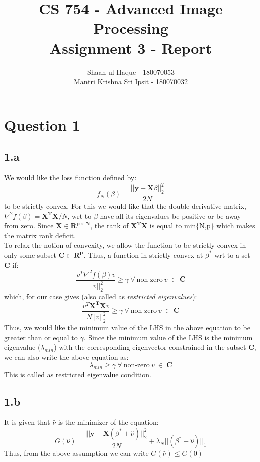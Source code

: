 \documentclass[12pt]{article}
\title{CS 754 - Advanced Image Processing\\Assignment 3 - Report}
\author{Shaan ul Haque - 180070053\\Mantri Krishna Sri Ipsit - 180070032}
\begin{document}
\maketitle

\section*{Question 1}
\subsection*{1.a}
We would like the loss function defined by:
\begin{equation*}
    f_N(\beta) = \frac{|| \boldsymbol{y-X}\beta||^2_2}{2N}
\end{equation*}
to be strictly convex. For this we would like that the double derivative matrix, $\nabla^2 f(\beta) = \boldsymbol{X^TX}/N$, wrt to $\beta$ have all its eigenvalues be positive or be away from zero. Since $\boldsymbol{X} \in \boldsymbol{R^{p \times N}}$, the rank of $\boldsymbol{X^TX}$ is equal to min\{N,p\} which makes the matrix rank deficit.\\
To relax the notion of convexity, we allow the function to be strictly convex in only some subset $\boldsymbol{C} \subset \boldsymbol{R^p}$. Thus, a function in strictly convex at $\beta^*$ wrt to a set $\boldsymbol{C}$ if:
\begin{equation*}
    \frac{v^T\nabla^2 f(\beta)v}{||v||^2_2} \geq \gamma \ \forall \ \textrm{non-zero} \ v \ \in \ \boldsymbol{C}
\end{equation*}
which, for our case gives (also called as \textit{restricted eigenvalues}):
\begin{equation*}
    \frac{v^T\boldsymbol{X^TX}v}{N||v||^2_2} \geq \gamma \ \forall \ \textrm{non-zero} \ v \ \in \ \boldsymbol{C}
\end{equation*}
Thus, we would like the minimum value of the LHS in the above equation to be greater than or equal to $\gamma$. Since the minimum value of the LHS is the minimum eigenvalue ($\lambda_{min}$) with the corresponding eigenvector constrained in the subset $\boldsymbol{C}$, we can also write the above equation as:
\begin{equation*}
    \lambda_{min} \geq \gamma \ \forall \ \textrm{non-zero} \ v \ \in \ \boldsymbol{C}
\end{equation*}
This is called as restricted eigenvalue condition.
\subsection*{1.b}
It is given that $\hat{\nu}$ is the minimizer of the equation:
\begin{equation*}
    G(\hat{\nu}) = \frac{||\boldsymbol{y-X}(\beta^*+\hat{\nu})||^2_2}{2N}+\lambda_N||(\beta^*+\hat{\nu})||_1
\end{equation*}
Thus, from the above assumption we can write $G(\hat{\nu}) \leq G(0)$
\end{document}

